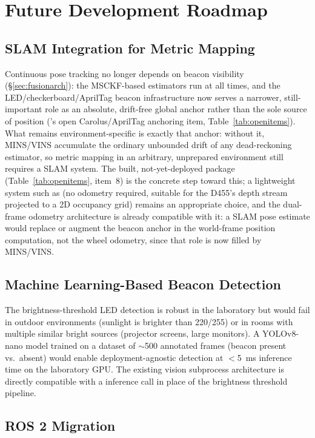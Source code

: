 \section{Future Development Roadmap}

\subsection{SLAM Integration for Metric Mapping}

Continuous pose tracking no longer depends on beacon visibility (\S\ref{sec:fusionarch}): the MSCKF-based estimators run at all times, and the LED/checkerboard/AprilTag beacon infrastructure now serves a narrower, still-important role as an absolute, drift-free global anchor rather than the sole source of position ('s open Carolus/AprilTag anchoring item, Table~\ref{tab:openitems}). What remains environment-specific is exactly that anchor: without it, MINS/VINS accumulate the ordinary unbounded drift of any dead-reckoning estimator, so metric mapping in an arbitrary, unprepared environment still requires a SLAM system. The built, not-yet-deployed  package (Table~\ref{tab:openitems}, item~8) is the concrete step toward this; a lightweight system such as  (no odometry required, suitable for the D455's depth stream projected to a 2D occupancy grid) remains an appropriate choice, and the dual-frame odometry architecture is already compatible with it: a SLAM pose estimate would replace or augment the beacon anchor in the world-frame position computation, not the wheel odometry, since that role is now filled by MINS/VINS.

\subsection{Machine Learning-Based Beacon Detection}

The brightness-threshold LED detection is robust in the laboratory but would fail in outdoor environments (sunlight is brighter than 220/255) or in rooms with multiple similar bright sources (projector screens, large monitors). A YOLOv8-nano model trained on a dataset of $\sim$500 annotated frames (beacon present vs.\ absent) would enable deployment-agnostic detection at $<$5~ms inference time on the laboratory GPU. The existing vision subprocess architecture is directly compatible with a  inference call in place of the brightness threshold pipeline.

\subsection{ROS 2 Migration}
\label{sec:ros2migration}

